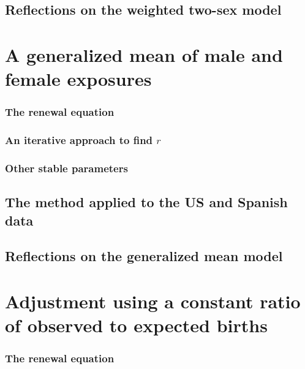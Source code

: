   \section{Reflections on the weighted two-sex model}
      
  

  \chapter{A generalized mean of male and female exposures}
    
      \subsection{The renewal equation}
         
      
      \subsection{An iterative approach to find $r$}
         
      
      \subsection{Other stable parameters}
         
      
      \section{The method applied to the US and Spanish data}
        
      \section{Reflections on the generalized mean model}
        
        
  \chapter{Adjustment using a constant ratio of observed to expected births}
      
    \subsection{The renewal equation}
      
 
